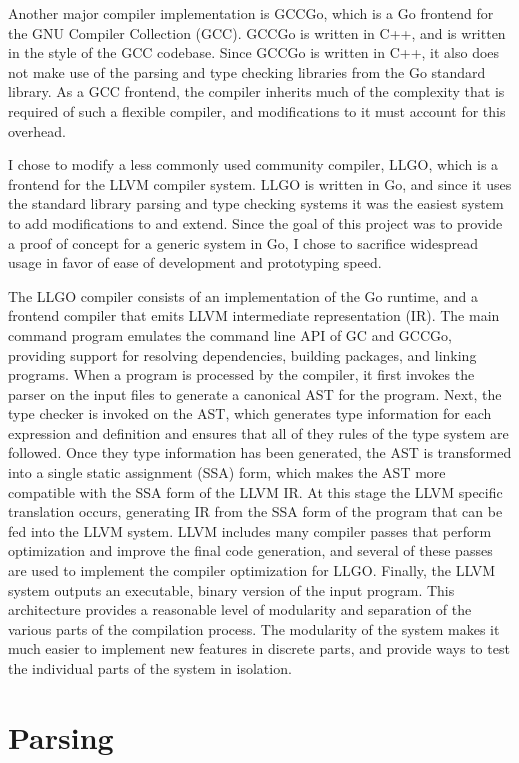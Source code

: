 \documentclass[letterpaper,twocolumn,11pt]{article}
\begin{document}
 Another major compiler implementation is GCCGo, which is a Go frontend for the GNU Compiler Collection (GCC). GCCGo is written in C++, and is written in the style of the GCC codebase. Since GCCGo is written in C++, it also does not make use of the parsing and type checking libraries from the Go standard library. As a GCC frontend, the compiler inherits much of the complexity that is required of such a flexible compiler, and modifications to it must account for this overhead.

I chose to modify a less commonly used community compiler, LLGO, which is a frontend for the LLVM compiler system. LLGO is written in Go, and since it uses the standard library parsing and type checking systems it was the easiest system to add modifications to and extend. Since the goal of this project was to provide a proof of concept for a generic system in Go, I chose to sacrifice widespread usage in favor of ease of development and prototyping speed.

The LLGO compiler consists of an implementation of the Go runtime, and a frontend compiler that emits LLVM intermediate representation (IR). The main command program emulates the command line API of GC and GCCGo, providing support for resolving dependencies, building packages, and linking programs. When a program is processed by the compiler, it first invokes the parser on the input files to generate a canonical AST for the program. Next, the type checker is invoked on the AST, which generates type information for each expression and definition and ensures that all of they rules of the type system are followed. Once they type information has been generated, the AST is transformed into a single static assignment (SSA) form, which makes the AST more compatible with the SSA form of the LLVM IR. At this stage the LLVM specific translation occurs, generating IR from the SSA form of the program that can be fed into the LLVM system. LLVM includes many compiler passes that perform optimization and improve the final code generation, and several of these passes are used to implement the compiler optimization for LLGO. Finally, the LLVM system outputs an executable, binary version of the input program. This architecture provides a reasonable level of modularity and separation of the various parts of the compilation process. The modularity of the system makes it much easier to implement new features in discrete parts, and provide ways to test the individual parts of the system in isolation.

\section{Parsing} \label{parsing}
\end{document}

